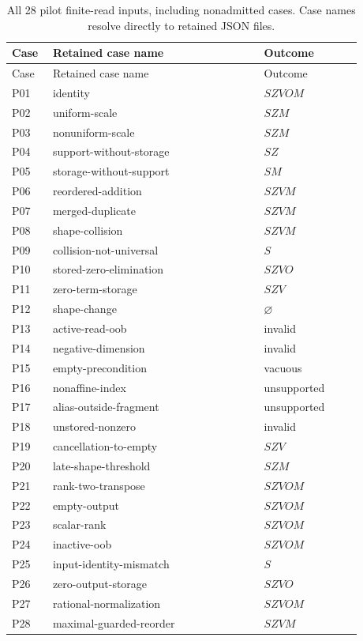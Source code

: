 \begin{longtable}{@{}p{0.09\linewidth}p{0.54\linewidth}p{0.25\linewidth}@{}}
\caption{All 28 pilot finite-read inputs, including nonadmitted cases. Case names resolve directly to retained JSON files.}\label{tab:pilot-catalog}\\
\toprule Case & Retained case name & Outcome\\\midrule\endfirsthead
\toprule Case & Retained case name & Outcome\\\midrule\endhead
\bottomrule\endfoot
P01 & identity & $SZVOM$\\
P02 & uniform-scale & $SZM$\\
P03 & nonuniform-scale & $SZM$\\
P04 & support-without-storage & $SZ$\\
P05 & storage-without-support & $SM$\\
P06 & reordered-addition & $SZVM$\\
P07 & merged-duplicate & $SZVM$\\
P08 & shape-collision & $SZVM$\\
P09 & collision-not-universal & $S$\\
P10 & stored-zero-elimination & $SZVO$\\
P11 & zero-term-storage & $SZV$\\
P12 & shape-change & $\varnothing$\\
P13 & active-read-oob & invalid\\
P14 & negative-dimension & invalid\\
P15 & empty-precondition & vacuous\\
P16 & nonaffine-index & unsupported\\
P17 & alias-outside-fragment & unsupported\\
P18 & unstored-nonzero & invalid\\
P19 & cancellation-to-empty & $SZV$\\
P20 & late-shape-threshold & $SZM$\\
P21 & rank-two-transpose & $SZVOM$\\
P22 & empty-output & $SZVOM$\\
P23 & scalar-rank & $SZVOM$\\
P24 & inactive-oob & $SZVOM$\\
P25 & input-identity-mismatch & $S$\\
P26 & zero-output-storage & $SZVO$\\
P27 & rational-normalization & $SZVOM$\\
P28 & maximal-guarded-reorder & $SZVM$\\
\end{longtable}
